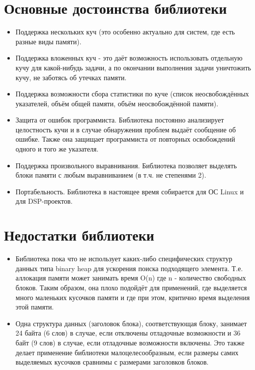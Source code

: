 \documentclass{article}
\begin{document}
\section{Основные достоинства библиотеки}
\begin{itemize}
\item Поддержка нескольких куч (это особенно актуально для систем, где есть разные виды памяти).
\item Поддержка вложенных куч - это даёт возможность использовать отдельную кучу для какой-нибудь задачи, а по окончании выполнения задачи уничтожить кучу, не заботясь об утечках памяти.
\item Поддержка возможности сбора статистики по куче (список неосвобождённых указателей, объём общей памяти, объём неосвобождённой памяти).
\item Защита от ошибок программиста. Библиотека постоянно анализирует целостность кучи и в случае обнаружения проблем выдаёт сообщение об ошибке. Также она защищает программиста от повторных освобождений одного и того же указателя.
\item Поддержка произвольного выравнивания. Библиотека позволяет выделять блоки памяти с любым выравниванием (в т.ч. не степенями 2).
\item Портабельность. Библиотека в настоящее время собирается для ОС Linux и для DSP-проектов.
\end{itemize}

\section{Недостатки библиотеки}
\begin{itemize}
\item Библиотека пока что не использует каких-либо специфических структур данных типа binary heap для ускорения поиска подходящего элемента. Т.е. аллокация памяти может занимать время O(n) где n - количество свободных блоков. Таким образом, она плохо подойдёт для применений, где выделяется много маленьких кусочков памяти и где при этом, критично время выделения этой памяти.
\item Одна структура данных (заголовок блока), соответствующая блоку, занимает 24 байта (6 слов) в случае, если отключены отладочные возможности и 36 байт (9 слов) в случае, если отладочные возможности включены. Это также делает применение библиотеки малоцелесообразным, если размеры самих выделяемых кусочков сравнимы с размерами заголовков блоков.
\end{itemize}
\end{document}
